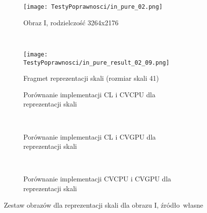 \begin{figure}[h]

\begin{center}
\begin{subfigure}[t]{0.3\textwidth}
\texttt{[image: TestyPoprawnosci/in\_pure\_02.png]}
\caption{Obraz I, rodzielczość 3264x2176}
\label{fig:valPure02}
\end{subfigure}
~
\begin{subfigure}[t]{0.3\textwidth}
\texttt{[image: TestyPoprawnosci/in\_pure\_result\_02\_09.png]}
\caption{Fragmet reprezentacji skali (rozmiar skali 41)}
\label{fig:valPureResult02}
\end{subfigure}
\end{center}

\begin{subfigure}[t]{0.3\textwidth}
	\centering
	\setlength\fboxsep{0pt}
	\setlength\fboxrule{0.5pt}
	\caption{Porównanie implementacji CL i CVCPU dla reprezentacji skali}
	\label{fig:valPure2CLCVCPU}
\end{subfigure}
~
\begin{subfigure}[t]{0.3\textwidth}
	\centering
	\setlength\fboxsep{0pt}
	\setlength\fboxrule{0.5pt}
	\caption{Porównanie implementacji CL i CVGPU dla reprezentacji skali}
	\label{fig:valPure2CLCVGPU}
\end{subfigure}
~
\begin{subfigure}[t]{0.3\textwidth}
	\centering
	\setlength\fboxsep{0pt}
	\setlength\fboxrule{0.5pt}
	\caption{Porównanie implementacji CVCPU i CVGPU dla reprezentacji skali}
	\label{fig:valPure2CVCPUCVGPU}                 
\end{subfigure}
\caption{Zestaw obrazów dla reprezentacji skali dla obrazu I, \tiny{źródło~własne}}

\label{fig:valPure2}
\end{figure}

